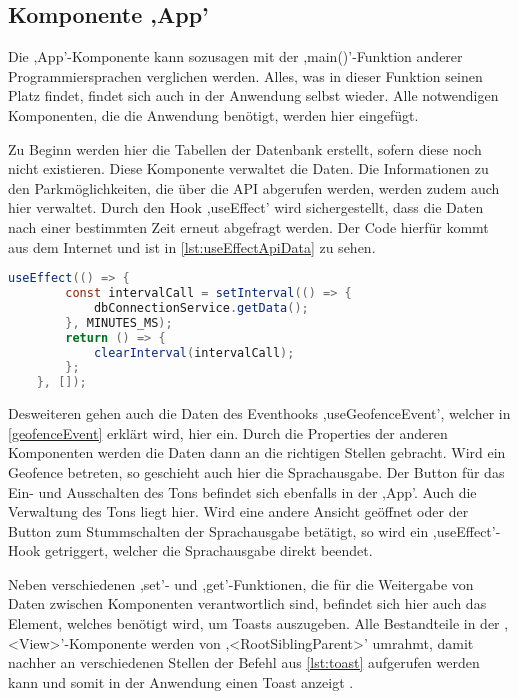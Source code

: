 \subsection{Komponente ,App'}
Die ,App'-Komponente kann sozusagen mit der ,main()'-Funktion anderer Programmiersprachen verglichen werden. Alles, was in dieser Funktion seinen Platz findet, findet sich auch in der Anwendung selbst wieder. Alle notwendigen Komponenten, die die Anwendung benötigt, werden hier eingefügt. 

Zu Beginn werden hier die Tabellen der Datenbank erstellt, sofern diese noch nicht existieren. Diese Komponente verwaltet die Daten. Die Informationen zu den Parkmöglichkeiten, die über die API abgerufen werden, werden zudem auch hier verwaltet. Durch den Hook ,useEffect' wird sichergestellt, dass die Daten nach einer bestimmten Zeit erneut abgefragt werden. Der Code hierfür kommt aus dem Internet und ist in \autoref{lst:useEffectApiData} zu sehen.

\begin{lstlisting}[caption={In diesem Hook werden nach der Zeit, welche sich hinter der Variable ,MINUTES\_MS' verbirgt, die Daten der API abgerufen, was über die Funktion in Zeile 3 geschieht. (Quelle: \cite{useIntervalCode})},captionpos=b, language=Java, label=lst:useEffectApiData]
	useEffect(() => {
		const intervalCall = setInterval(() => {
			dbConnectionService.getData();
		}, MINUTES_MS);
		return () => {
			clearInterval(intervalCall);
		};
	}, []);
\end{lstlisting}

Desweiteren gehen auch die Daten des Eventhooks ,useGeofenceEvent', welcher in \autoref{geofenceEvent} erklärt wird, hier ein. Durch die Properties der anderen Komponenten werden die Daten dann an die richtigen Stellen gebracht. Wird ein Geofence betreten, so geschieht auch hier die Sprachausgabe. Der Button für das Ein- und Ausschalten des Tons befindet sich ebenfalls in der ,App'. Auch die Verwaltung des Tons liegt hier. Wird eine andere Ansicht geöffnet oder der Button zum Stummschalten der Sprachausgabe betätigt, so wird ein ,useEffect'-Hook getriggert, welcher die Sprachausgabe direkt beendet.

Neben verschiedenen ,set'- und ,get'-Funktionen, die für die Weitergabe von Daten zwischen Komponenten verantwortlich sind, befindet sich hier auch das Element, welches benötigt wird, um Toasts auszugeben. Alle Bestandteile in der ,<View>'-Komponente werden von ,<RootSiblingParent>' umrahmt, damit nachher an verschiedenen Stellen der Befehl aus \autoref{lst:toast} aufgerufen werden kann und somit in der Anwendung einen Toast anzeigt \cite{toastLibrary}.

